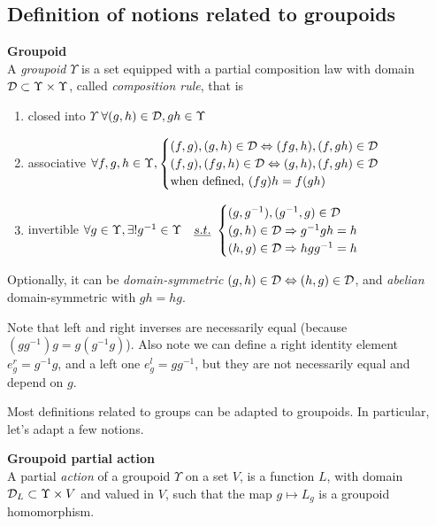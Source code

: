\subsection{Definition of notions related to groupoids}

\begin{definition}\textbf{Groupoid}\\
A \emph{groupoid} $\Upsilon$ is a set equipped with a partial composition law with domain $\mathcal{D} \subset \Upsilon \times \Upsilon$, called \emph{composition rule}, that is
\begin{enumerate}
  \item\label{enum:g1} closed into $\Upsilon$ \ie $\forall (g, h) \in \mathcal{D}, gh \in \Upsilon$
  \item\label{enum:g2} associative \ie
    $\forall f,g,h \in \Upsilon,
      \begin{cases}
        (f, g), (g, h) \in \mathcal{D} \Leftrightarrow (fg,h), (f, gh) \in \mathcal{D}\\
        (f, g), (fg, h) \in \mathcal{D} \Leftrightarrow (g,h), (f, gh) \in \mathcal{D}\\
        \text{when defined, } (fg)h = f(gh)
      \end{cases}$ \label{enum:2}
  \item\label{enum:g3} invertible \ie
    $\forall g \in \Upsilon, \exists! g^{-1} \in \Upsilon \quad\emph{s.t.}~
      \begin{cases}
        (g,g^{-1}), (g^{-1},g)  \in \mathcal{D}\\
        (g,h) \in \mathcal{D} \Rightarrow g^{-1}gh = h\\
        (h,g) \in \mathcal{D} \Rightarrow hgg^{-1} = h
      \end{cases}$
\end{enumerate}
Optionally, it can be \emph{domain-symmetric} \ie $(g,h) \in \mathcal{D} \Leftrightarrow (h,g) \in \mathcal{D}$, and \emph{abelian} \ie domain-symmetric with $gh = hg$.
\end{definition}

\begin{remark}
Note that left and right inverses are necessarily equal (because $(gg^{-1})g=g(g^{-1}g)$). Also note we can define a right identity element $e^r_g = g^{-1}g$, and a left one $e^l_g = gg^{-1}$, but they are not necessarily equal and depend on $g$.
\end{remark}

Most definitions related to groups can be adapted to groupoids. In particular, let's adapt a few notions.

\begin{definition}\textbf{Groupoid partial action}\\
A partial \emph{action} of a groupoid $\Upsilon$ on a set $V$, is a function $L$, with domain $\mathcal{D}_L \subset \Upsilon \times V$ and valued in $V$, such that the map $g \mapsto L_g$ is a groupoid homomorphism.
\end{definition}

